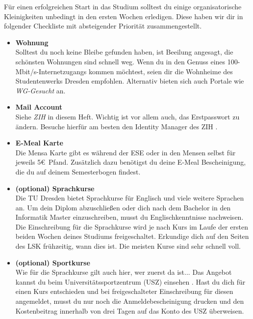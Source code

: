 \newcommand{\checkbox}[1]{\item[$\square$]\textbf{#1}\\}


Für einen erfolgreichen Start in das Studium solltest du einige organisatorische Kleinigkeiten unbedingt in den ersten Wochen erledigen.
Diese haben wir dir in folgender Checkliste mit absteigender Priorität zusammengestellt.

\begin{itemize}[leftmargin=*]

\checkbox{Wohnung}
Solltest du noch keine Bleibe gefunden haben, ist Beeilung angesagt, die schönsten Wohnungen sind schnell weg.
Wenn du in den Genuss eines 100-Mbit/s-Internetzugangs kommen möchtest, seien dir die Wohnheime  des Studentenwerks Dresden empfohlen. Alternativ bieten sich auch Portale wie \textit{WG-Gesucht}  an.

\checkbox{Mail Account}
Siehe \textit{ZIH} in diesem Heft. Wichtig ist vor allem auch, das Erstpasswort zu ändern. Besuche hierfür am besten den Identity Manager des ZIH .

\checkbox{E-Meal Karte}
Die Mensa Karte gibt es während der ESE oder in den Mensen selbst für jeweils 5\euro\ Pfand.
Zusätzlich dazu benötigst du deine E-Meal Bescheinigung, die du auf deinem Semesterbogen findest.

\checkbox{(optional) Sprachkurse}
Die TU Dresden bietet Sprachkurse für Englisch und viele weitere Sprachen an. Um dein Diplom abzuschließen oder dich nach dem Bachelor in den Informatik Master einzuschreiben, musst du Englischkenntnisse nachweisen. Die Einschreibung für die Sprachkurse wird je nach Kurs im Laufe der ersten beiden Wochen deines Studiums freigeschaltet.
Erkundige dich auf den Seiten des LSK  frühzeitig, wann dies ist. Die meisten Kurse sind sehr schnell voll.

\checkbox{(optional) Sportkurse}
Wie für die Sprachkurse gilt auch hier, wer zuerst da ist...
Das Angebot kannst du beim Universitätssportzentrum (USZ) einsehen .
Hast du dich für einen Kurs entschieden und bei freigeschalteter Einschreibung für diesen angemeldet, musst du nur noch die Anmeldebescheinigung drucken und den Kostenbeitrag innerhalb von drei Tagen auf das Konto des USZ überweisen.


\end{itemize}
